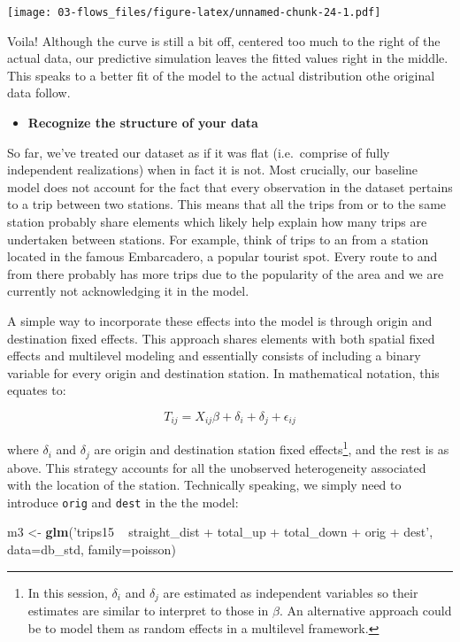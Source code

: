 \documentclass[]{book}
\newenvironment{Shaded}{\begin{snugshade}}{\end{snugshade}}
\newcommand{\KeywordTok}[1]{\textcolor[rgb]{0.13,0.29,0.53}{\textbf{#1}}}
\newcommand{\DataTypeTok}[1]{\textcolor[rgb]{0.13,0.29,0.53}{#1}}
\newcommand{\StringTok}[1]{\textcolor[rgb]{0.31,0.60,0.02}{#1}}
\newcommand{\NormalTok}[1]{#1}
\providecommand{\tightlist}{%
  \setlength{\itemsep}{0pt}\setlength{\parskip}{0pt}}
\begin{document}
\texttt{[image: 03-flows\_files/figure-latex/unnamed-chunk-24-1.pdf]}

Voila! Although the curve is still a bit off, centered too much to the
right of the actual data, our predictive simulation leaves the fitted
values right in the middle. This speaks to a better fit of the model to
the actual distribution othe original data follow.

\begin{itemize}
\tightlist
\item
  \textbf{Recognize the structure of your data}
\end{itemize}

So far, we've treated our dataset as if it was flat (i.e.~comprise of
fully independent realizations) when in fact it is not. Most crucially,
our baseline model does not account for the fact that every observation
in the dataset pertains to a trip between two stations. This means that
all the trips from or to the same station probably share elements which
likely help explain how many trips are undertaken between stations. For
example, think of trips to an from a station located in the famous
Embarcadero, a popular tourist spot. Every route to and from there
probably has more trips due to the popularity of the area and we are
currently not acknowledging it in the model.

A simple way to incorporate these effects into the model is through
origin and destination fixed effects. This approach shares elements with
both spatial fixed effects and multilevel modeling and essentially
consists of including a binary variable for every origin and destination
station. In mathematical notation, this equates to:

\[
T_{ij} = X_{ij}\beta + \delta_i + \delta_j + \epsilon_{ij}
\]

where \(\delta_i\) and \(\delta_j\) are origin and destination station
fixed effects\footnote{In this session, \(\delta_i\) and \(\delta_j\)
  are estimated as independent variables so their estimates are similar
  to interpret to those in \(\beta\). An alternative approach could be
  to model them as random effects in a multilevel framework.}, and the
rest is as above. This strategy accounts for all the unobserved
heterogeneity associated with the location of the station. Technically
speaking, we simply need to introduce \texttt{orig} and \texttt{dest} in
the the model:

\begin{Shaded}
\begin{Highlighting}[]
\NormalTok{m3 <-}\StringTok{ }\KeywordTok{glm}\NormalTok{(}\StringTok{'trips15 ~ straight_dist + total_up + total_down + orig + dest'}\NormalTok{, }
          \DataTypeTok{data=}\NormalTok{db_std,}
          \DataTypeTok{family=}\NormalTok{poisson)}
\end{Highlighting}
\end{Shaded}
\end{document}
